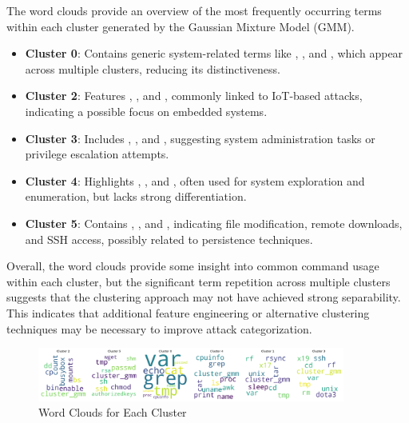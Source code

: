         The word clouds provide an overview of the most frequently occurring terms within each cluster generated by the Gaussian Mixture Model (GMM).

        \begin{itemize}
            \item \textbf{Cluster 0}: Contains generic system-related terms like , , and , which appear across multiple clusters, reducing its distinctiveness.
            \item \textbf{Cluster 2}: Features , , and , commonly linked to IoT-based attacks, indicating a possible focus on embedded systems.
            \item \textbf{Cluster 3}: Includes , , and , suggesting system administration tasks or privilege escalation attempts.
            \item \textbf{Cluster 4}: Highlights , , and , often used for system exploration and enumeration, but lacks strong differentiation.
            \item \textbf{Cluster 5}: Contains , , and , indicating file modification, remote downloads, and SSH access, possibly related to persistence techniques.
        \end{itemize}

        Overall, the word clouds provide some insight into common command usage within each cluster, but the significant term repetition across multiple clusters suggests that the clustering approach may not have achieved strong separability. This indicates that additional feature engineering or alternative clustering techniques may be necessary to improve attack categorization. 

            \begin{figure}[H]
                \centering
                \includegraphics[width=0.9\textwidth]{../figures/plots/section3/circular_wordclouds.png}
                \caption{Word Clouds for Each Cluster}
                \label{fig:word_clouds}
            \end{figure}
            
